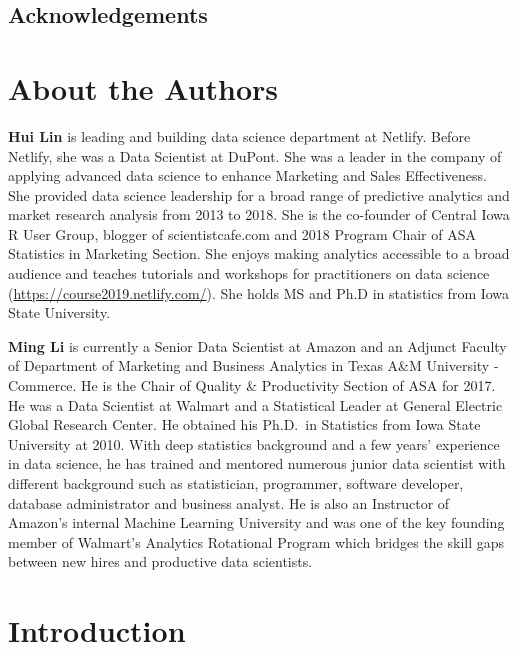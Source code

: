 \documentclass[12pt,]{krantz}
\begin{document}
\hypertarget{acknowledgements}{%
\section*{Acknowledgements}\label{acknowledgements}}


\hypertarget{about-the-authors}{%
\chapter*{About the Authors}\label{about-the-authors}}


\textbf{Hui Lin} is leading and building data science department at Netlify. Before Netlify, she was a Data Scientist at DuPont. She was a leader in the company of applying advanced data science to enhance Marketing and Sales Effectiveness. She provided data science leadership for a broad range of predictive analytics and market research analysis from 2013 to 2018. She is the co-founder of Central Iowa R User Group, blogger of scientistcafe.com and 2018 Program Chair of ASA Statistics in Marketing Section. She enjoys making analytics accessible to a broad audience and teaches tutorials and workshops for practitioners on data science (\url{https://course2019.netlify.com/}). She holds MS and Ph.D in statistics from Iowa State University.

\textbf{Ming Li} is currently a Senior Data Scientist at Amazon and an Adjunct Faculty of Department of Marketing and Business Analytics in Texas A\&M University - Commerce. He is the Chair of Quality \& Productivity Section of ASA for 2017. He was a Data Scientist at Walmart and a Statistical Leader at General Electric Global Research Center. He obtained his Ph.D.~in Statistics from Iowa State University at 2010. With deep statistics background and a few years' experience in data science, he has trained and mentored numerous junior data scientist with different background such as statistician, programmer, software developer, database administrator and business analyst. He is also an Instructor of Amazon's internal Machine Learning University and was one of the key founding member of Walmart's Analytics Rotational Program which bridges the skill gaps between new hires and productive data scientists.

\mainmatter

\hypertarget{introduction}{%
\chapter{Introduction}\label{introduction}}
\end{document}
